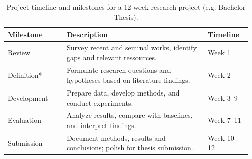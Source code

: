 \begin{table}[ht]
  \centering
  \begin{tabular}{p{0.23\linewidth} p{0.55\linewidth} p{0.17\linewidth}}
    \toprule
    \textbf{Milestone} & \textbf{Description} & \textbf{Timeline} \\
    \midrule
    Review & Survey recent and seminal works, identify gaps and relevant ressources. & Week 1 \\
    Definition* & Formulate research questions and hypotheses based on literature findings. & Week 2 \\
    Development & Prepare data, develop methods, and conduct experiments. & Week 3--9 \\
    Evaluation & Analyze results, compare with baselines, and interpret findings. & Week 7--11 \\
    Submission & Document methods, results and conclusions; polish for thesis submission. & Week 10--12 \\
    \bottomrule
  \end{tabular}
  \caption{Project timeline and milestones for a 12-week research project (e.g. Bachelor Thesis).}
  \label{tab:timeline}
\end{table}


